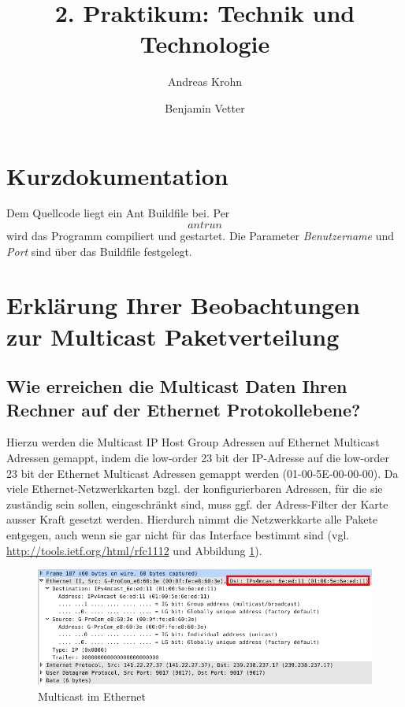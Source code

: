 \documentclass[a4paper,10pt]{article}
\title{2. Praktikum: Technik und Technologie}
\author{Andreas Krohn \and Benjamin Vetter}
\begin{document}
\maketitle

\section{Kurzdokumentation}

Dem Quellcode liegt ein Ant Buildfile bei. Per \[ant run\] wird das Programm compiliert und gestartet. Die Parameter \emph{Benutzername} und \emph{Port} sind über das Buildfile festgelegt.



\section{Erklärung Ihrer Beobachtungen zur Multicast Paketverteilung}

\subsection{Wie erreichen die Multicast Daten Ihren Rechner auf der Ethernet Protokollebene?}

Hierzu werden die Multicast IP Host Group Adressen auf Ethernet Multicast Adressen gemappt,
indem die low-order 23 bit der IP-Adresse auf die low-order 23 bit der Ethernet Multicast Adressen gemappt werden (01-00-5E-00-00-00).
Da viele Ethernet-Netzwerkkarten bzgl. der konfigurierbaren Adressen, für die sie zuständig sein sollen, eingeschränkt sind, muss ggf. der Adress-Filter der Karte ausser Kraft gesetzt werden.
Hierdurch nimmt die Netzwerkkarte alle Pakete entgegen, auch wenn sie gar nicht für das Interface bestimmt sind (vgl. \url{http://tools.ietf.org/html/rfc1112} und Abbildung \ref{multicast_ethernet}).

\begin{figure}[h]
	\begin{center}
		\includegraphics[width=1\textwidth]{multicast_ethernet.png}
	\end{center}

	\caption{Multicast im Ethernet}

	\label{multicast_ethernet}
\end{figure}
\end{document}
